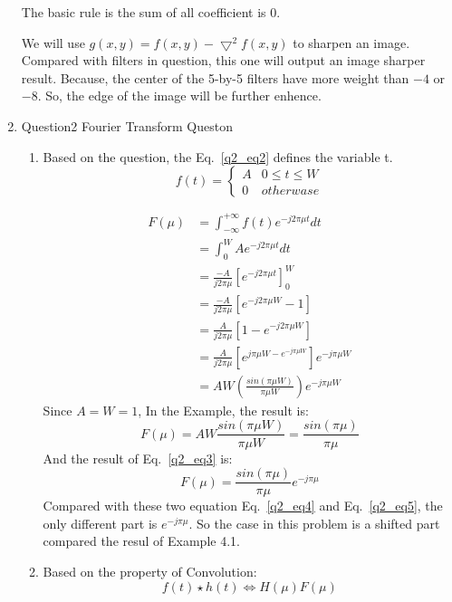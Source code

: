 \documentclass[12pt]{article}
\begin{document}
\begin{enumerate}[leftmargin=\labelsep]
The basic rule is the sum of all coefficient is 0.

We will use $g(x, y) = f(x,y) - \bigtriangledown^2 f(x,y) $ to sharpen an image.
Compared with filters in question, this one will output an image sharper result.
Because, the center of the 5-by-5 filters have more weight than $-4$ or $-8$.
So, the edge of the image will be further enhence.

\vspace*{1em}

\item Question2 Fourier Transform Queston
\begin{enumerate}
        \item Based on the question, the Eq.~\ref{q2_eq2} defines the variable t.
        \begin{equation}
                f(t) =
                \begin{cases}
                A & 0 \leq t \leq W \\
                0 & otherwase 
                \end{cases}   
        \label{q2_eq2}    
        \end{equation}
        

        \begin{equation}
        \begin{aligned}
        F(\mu)
        &= \int_{-\infty}^{+\infty}f(t) e^{-j2 \pi \mu t}dt\\
        &= \int_0^W A e^{-j2 \pi \mu t} dt\\
        &= \frac{-A}{j2 \pi \mu} [e^{-j 2 \pi \mu t}]_{0}^{W}\\
        &= \frac{-A}{j2 \pi \mu} [e^{-j 2 \pi \mu W}  - 1]\\
        &= \frac{A}{j2 \pi \mu} [1 - e^{-j2 \pi \mu W}]\\
        &= \frac{A}{j2 \pi \mu} [e^{j \pi \mu W - e^{-j \pi \mu W}}]e^{-j \pi \mu W}\\
        &= AW (\frac{sin(\pi \mu W)}{\pi \mu W}) e^{-j \pi \mu W}
        \label{q2_eq3}
        \end{aligned}
        \end{equation}
        Since $A = W = 1 $, In the Example, the result is:
        \begin{equation}
            F(\mu) = AW \frac{sin(\pi \mu W)}{\pi \mu W} = \frac{sin(\pi \mu)}{\pi \mu}
        \label{q2_eq4}
        \end{equation}
        And the result of Eq.~\ref{q2_eq3} is:
        \begin{equation}
            F(\mu) = \frac{sin(\pi \mu)}{\pi \mu} e^{-j \pi \mu}
        \label{q2_eq5}
        \end{equation}
        Compared with these two equation Eq.~\ref{q2_eq4} and Eq.~\ref{q2_eq5}, the only different part is $e^{-j \pi \mu}$. So the case in this problem is a shifted part compared the resul of Example 4.1.
        \vspace*{1em}
        \item   
        Based on the property of Convolution:
        $$
            f(t) \star h(t) \Longleftrightarrow H(\mu)F(\mu)
        $$
        

\end{enumerate}
\end{enumerate}
\end{document}
